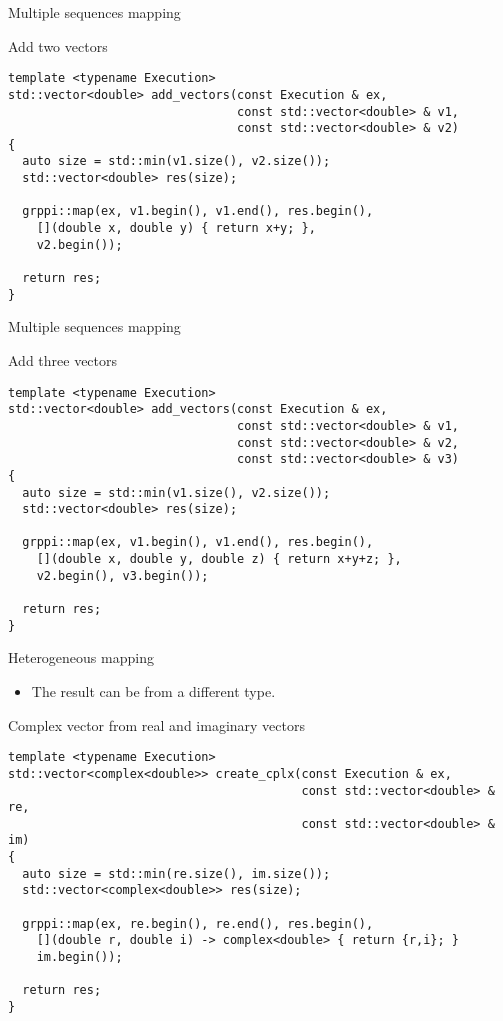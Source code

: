 \begin{frame}[t,fragile]{Multiple sequences mapping}
\begin{block}{Add two vectors}
\begin{lstlisting}
template <typename Execution>
std::vector<double> add_vectors(const Execution & ex, 
                                const std::vector<double> & v1,
                                const std::vector<double> & v2) 
{
  auto size = std::min(v1.size(), v2.size());
  std::vector<double> res(size);

  grppi::map(ex, v1.begin(), v1.end(), res.begin(),
    [](double x, double y) { return x+y; },
    v2.begin());

  return res;
}
\end{lstlisting}
\end{block}
\end{frame}

\begin{frame}[t,fragile]{Multiple sequences mapping}
\begin{block}{Add three vectors}
\begin{lstlisting}
template <typename Execution>
std::vector<double> add_vectors(const Execution & ex, 
                                const std::vector<double> & v1,
                                const std::vector<double> & v2,
                                const std::vector<double> & v3) 
{
  auto size = std::min(v1.size(), v2.size());
  std::vector<double> res(size);

  grppi::map(ex, v1.begin(), v1.end(), res.begin(),
    [](double x, double y, double z) { return x+y+z; },
    v2.begin(), v3.begin());

  return res;
}
\end{lstlisting}
\end{block}
\end{frame}

\begin{frame}[t,fragile]{Heterogeneous mapping}
\begin{itemize}
  \item The result can be from a different type.
\end{itemize}
\begin{block}{Complex vector from real and imaginary vectors}
\begin{lstlisting}
template <typename Execution>
std::vector<complex<double>> create_cplx(const Execution & ex,
                                         const std::vector<double> & re,
                                         const std::vector<double> & im)
{
  auto size = std::min(re.size(), im.size());
  std::vector<complex<double>> res(size);

  grppi::map(ex, re.begin(), re.end(), res.begin(),
    [](double r, double i) -> complex<double> { return {r,i}; }
    im.begin());

  return res;
}
\end{lstlisting}
\end{block}
\end{frame}
